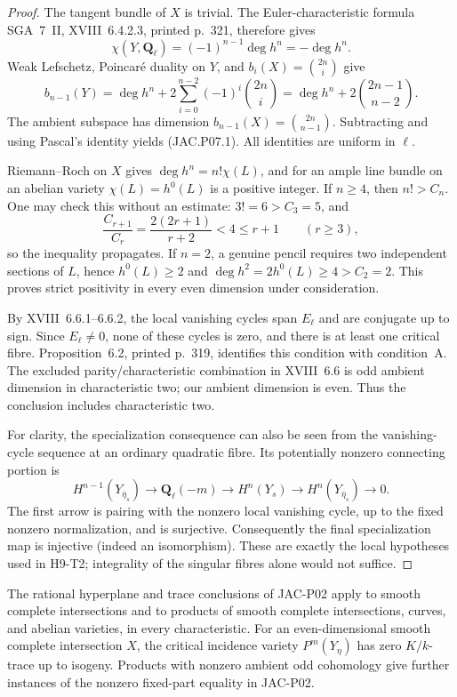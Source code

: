 \begin{proof}
The tangent bundle of $X$ is trivial.  The Euler-characteristic
formula SGA~7~II, XVIII~6.4.2.3, printed p.~321, therefore gives
\[
 \chi(Y,\mathbf Q_\ell)=(-1)^{n-1}\deg h^n=-\deg h^n.
\]
Weak Lefschetz, Poincar\'e duality on $Y$, and
$b_i(X)=\binom{2n}{i}$ give
\[
 b_{n-1}(Y)=\deg h^n+
       2\sum_{i=0}^{n-2}(-1)^i\binom{2n}{i}
 =\deg h^n+2\binom{2n-1}{n-2}.
\]
The ambient subspace has dimension $b_{n-1}(X)=\binom{2n}{n-1}$.
Subtracting and using Pascal's identity yields (JAC.P07.1).
All identities are uniform in $\ell$.

Riemann--Roch on $X$ gives $\deg h^n=n!\chi(L)$, and for an
ample line bundle on an abelian variety $\chi(L)=h^0(L)$ is a
positive integer.  If $n\ge4$, then $n!>C_n$.  One may check this
without an estimate: $3!=6>C_3=5$, and
\[
 \frac{C_{r+1}}{C_r}=\frac{2(2r+1)}{r+2}<4\le r+1
 \qquad(r\ge3),
\]
so the inequality propagates.  If $n=2$, a genuine pencil requires
two independent sections of $L$, hence $h^0(L)\ge2$ and
$\deg h^2=2h^0(L)\ge4>C_2=2$.  This proves strict positivity
in every even dimension under consideration.

By XVIII~6.6.1--6.6.2, the local vanishing cycles span $E_\ell$
and are conjugate up to sign.  Since $E_\ell\ne0$, none of these
cycles is zero, and there is at least one critical fibre.
Proposition~6.2, printed p.~319, identifies this condition with
condition~A.  The excluded parity/characteristic combination in
XVIII~6.6 is odd ambient dimension in characteristic two; our
ambient dimension is even.  Thus the conclusion includes
characteristic two.

For clarity, the specialization consequence can also be seen from
the vanishing-cycle sequence at an ordinary quadratic fibre.
Its potentially nonzero connecting portion is
\[
 H^{n-1}(Y_{\overline\eta_s})\longrightarrow
 \mathbf Q_\ell(-m)\longrightarrow H^n(Y_s)
 \longrightarrow H^n(Y_{\overline\eta_s})\longrightarrow0.
\]
The first arrow is pairing with the nonzero local vanishing cycle,
up to the fixed nonzero normalization, and is surjective.
Consequently the final specialization map is injective (indeed an
isomorphism).  These are exactly the local hypotheses used in
H9-T2; integrality of the singular fibres alone would not suffice.
\end{proof}

\begin{proposition}
\label{jac:P08}
The rational hyperplane and trace conclusions of JAC-P02 apply to
smooth complete intersections and to products of smooth complete
intersections, curves, and abelian varieties, in every characteristic.
For an even-dimensional smooth complete intersection $X$, the
critical incidence variety $P^m(Y_\eta)$ has zero $K/k$-trace up to
isogeny.  Products with nonzero ambient odd cohomology give further
instances of the nonzero fixed-part equality in JAC-P02.
\end{proposition}

